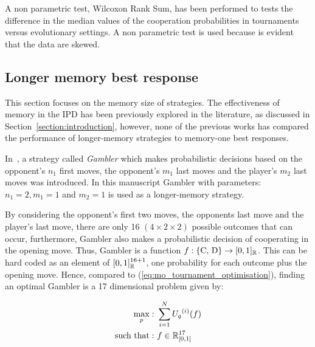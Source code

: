 \begin{table}[!htbp]
    \centering
    \resizebox{.7\columnwidth}{!}{%
    }
    \caption{A non parametric test, Wilcoxon Rank Sum, has been performed to
    tests the difference in the median values of the cooperation probabilities
    in tournaments versus evolutionary settings. A non parametric test is used because
    is evident that the data are skewed.}\label{table:wilcoxon_tests}
\end{table}

\subsection{Longer memory best response}\label{subsection:longer_memory_best_response}

This section focuses on the memory size of strategies. The effectiveness of
memory in the IPD has been previously explored in the literature, as
discussed in Section~\ref{section:introduction}, however, none of the
previous works has compared the performance of longer-memory strategies to
memory-one best responses.

In~\cite{Harper2017}, a strategy called \textit{Gambler} which makes
probabilistic decisions based on the opponent's \(n_1\) first moves, the
opponent's \(m_1\) last moves and the player's \(m_2\) last moves was
introduced. In this manuscript Gambler with parameters: $n_1 = 2, m_1 = 1$ and $m_2 = 1$ is used
as a longer-memory strategy.

By considering the opponent's first two moves, the opponents last move and the
player's last move, there are only 16 $(4 \times 2 \times 2)$ possible outcomes
that can occur, furthermore, Gambler also makes a probabilistic decision of
cooperating in the opening move. Thus, Gambler is a function \(f: \{\text{C,
D}\} \rightarrow [0, 1]_{\mathbb{R}}\). This can be hard coded as an element
of \([0, 1]_{\mathbb{R}} ^ {16 + 1}\), one probability for each outcome plus the opening
move. Hence, compared to (\ref{eq:mo_tournament_optimisation}), finding an
optimal Gambler is a 17 dimensional problem given by:

\begin{equation}\label{eq:gambler_optimisation}
    \begin{aligned}
    \max_p: & \ \sum_{i=1} ^ {N} {U_q}^{(i)} (f)
    \\
    \text{such that}: & \ f \in \mathbb{R}_{[0, 1]}^{17}
    \end{aligned}
\end{equation}

